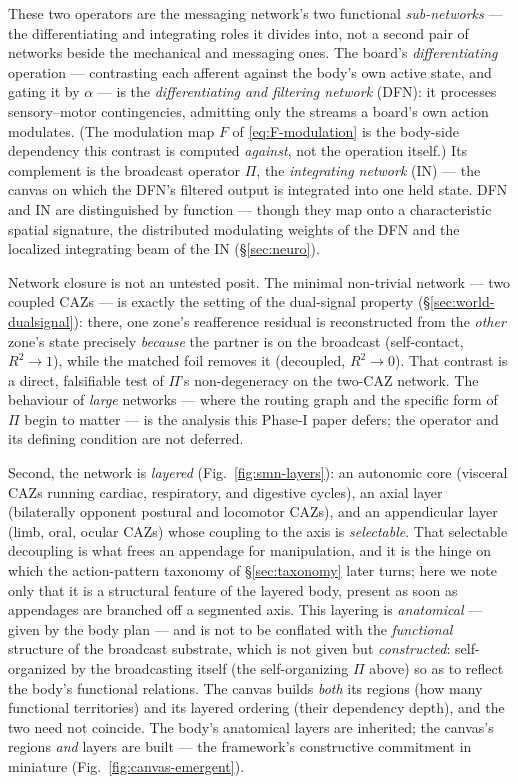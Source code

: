 \documentclass{article}
\begin{document}
These two operators are the messaging network's two functional \emph{sub-networks}
--- the differentiating and integrating roles it divides into, not a second pair of
networks beside the mechanical and messaging ones.  The board's \emph{differentiating}
operation --- contrasting each afferent against the body's own active state, and
gating it by $\alpha$ --- is the \emph{differentiating and filtering network} (DFN):
it processes sensory--motor contingencies, admitting only the streams a board's own
action modulates.  (The modulation map $F$ of \eqref{eq:F-modulation} is the
body-side dependency this contrast is computed \emph{against}, not the operation
itself.)  Its complement is the broadcast operator $\Pi$, the \emph{integrating
network} (IN) --- the canvas on which the DFN's filtered output is integrated into
one held state.  DFN and IN are distinguished by function --- though they map onto a
characteristic spatial signature, the distributed modulating weights of the DFN and
the localized integrating beam of the IN (\S\ref{sec:neuro}).

Network closure is not an untested posit.  The minimal non-trivial network
--- two coupled CAZs --- is exactly the setting of the dual-signal property
(\S\ref{sec:world-dualsignal}): there, one zone's reafference residual is
reconstructed from the \emph{other} zone's state precisely \emph{because} the
partner is on the broadcast (self-contact, $R^2\!\to\!1$), while the matched
foil removes it (decoupled, $R^2\!\to\!0$).  That contrast is a direct,
falsifiable test of $\Pi$'s non-degeneracy on the two-CAZ network.  The
behaviour of \emph{large} networks --- where the routing graph and the
specific form of $\Pi$ begin to matter --- is the analysis this Phase-I paper
defers; the operator and its defining condition are not deferred.

Second, the network is \emph{layered} (Fig.~\ref{fig:smn-layers}): an
autonomic core (visceral CAZs running cardiac, respiratory, and
digestive cycles), an axial layer (bilaterally opponent postural and
locomotor CAZs), and an appendicular layer (limb, oral, ocular CAZs)
whose coupling to the axis is \emph{selectable}.  That selectable
decoupling is what frees an appendage for manipulation, and it is the
hinge on which the action-pattern taxonomy of \S\ref{sec:taxonomy}
later turns; here we note only that it is a structural feature of the
layered body, present as soon as appendages are branched off a
segmented axis.  This layering is \emph{anatomical} --- given by the body plan
--- and is not to be conflated with the \emph{functional} structure of the
broadcast substrate, which is not given but \emph{constructed}: self-organized
by the broadcasting itself (the self-organizing $\Pi$ above) so as to reflect the
body's functional relations.  The canvas builds \emph{both} its regions (how many
functional territories) and its layered ordering (their dependency depth), and the
two need not coincide.  The body's anatomical layers are inherited; the canvas's
regions \emph{and} layers are built --- the framework's constructive commitment in
miniature (Fig.~\ref{fig:canvas-emergent}).
\end{document}
